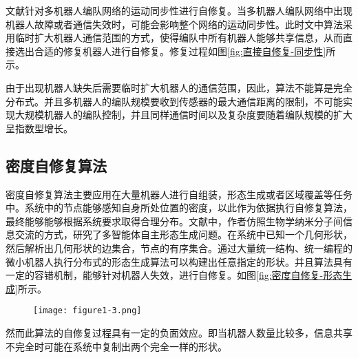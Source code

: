 文献\parencite{Zhang2006Motion}针对多机器人编队网络的运动同步性进行自修复。当多机器人编队网络中出现机器人故障或者通信失效时，可能会影响整个网络的运动同步性。此时文中算法采用临时扩大机器人通信范围的方式，使得编队中所有机器人能够共享信息，从而直接选出合适的修复机器人进行自修复。修复过程如图\ref{fig:直接自修复-同步性}所示。
\begin{figure*}[!htbp]
	\begin{multicols}{2}
		\begin{center}
		\end{center}
		\begin{center}
		\end{center}
		\begin{center}
		\end{center}
		\begin{center}
		\end{center}
	\end{multicols}
\end{figure*}
由于出现机器人缺失后需要临时扩大机器人的通信范围，因此，算法不能算是完全分布式。并且多机器人的编队规模要收到传感器的最大通信距离的限制，不可能实现大规模机器人的编队控制，并且同样通信时间以及复杂度要随着编队规模的扩大呈指数型增长。

\subsection{密度自修复算法}
密度自修复算法主要应用在大量机器人进行自组装，形态生成或者区域覆盖等任务中。系统中的节点能够感知自身所处位置的密度，以此作为依据执行自修复算法，最终能够能够根据系统要求取得合理分布。文献\parencite{arbuckle2010self}中，作者仿照生物学纳米分子间信息交流的方式，研究了多智能体自主形态生成问题。在系统中已知一个几何形状，然后解析出几何形状的边集合，节点的有序集合。通过大量统一结构、统一编程的微小机器人执行分布式的形态生成算法可以构建出任意指定的形状。并且算法具有一定的容错机制，能够针对机器人失效，进行自修复。如图\ref{fig:密度自修复-形态生成}所示。
\begin{figure}[!htbp]
	\centering
	\texttt{[image: figure1-3.png]}
\end{figure}
然而此算法的自修复过程具有一定的负面效应。即当机器人数量比较多，信息共享不完全时可能在系统中复制出两个完全一样的形状。

